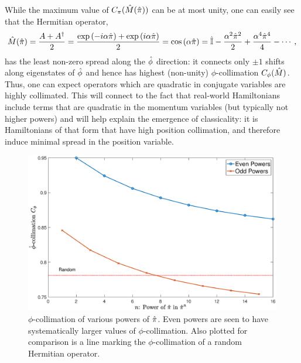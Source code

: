 \documentclass[aps,pra,onecolumn,nofootinbib,notitlepage,11pt,tightenlines]{revtex4-1}
\begin{document}
While the maximum value of $C_{\pi}(\hat{M}(\hat{\pi}))$ can be at most unity, one can easily see that the Hermitian operator,
\begin{equation}
\M(\oppi) = \frac{A + A^{\dag}}{2} = \frac{\exp{\left(- i \alpha \oppi\right)} + \exp{\left(i \alpha \oppi\right)}}{2} = \cos\left( \alpha \oppi \right) = \eye - \frac{\alpha^{2} \oppi^{2}}{2} + \frac{\alpha^{4} \oppi^{4}}{4} - \cdots \: ,
\end{equation}
has the least non-zero spread along the $\hat{\phi}$ direction: it connects only $\pm 1$ shifts along eigenstates of $\hat{\phi}$ and hence has highest (non-unity) $\phi$-collimation $C_{\phi}(\hat{M})$. 
Thus, one can expect operators which are quadratic in conjugate variables are highly collimated. This will connect to the fact that real-world Hamiltonians include terms that are quadratic in the momentum variables (but typically not higher powers) and will help explain the emergence of classicality: it is Hamiltonians of that form that have high position collimation, and therefore induce minimal spread in the position variable. 
\begin{figure}[h]
\includegraphics[width=\textwidth]{schwinger_powers.eps}
\caption{$\phi$-collimation of various powers of $\hat{\pi}$. Even powers are seen to have systematically larger values of $\phi$-collimation. Also plotted for comparison is a line marking the $\phi$-collimation of a random Hermitian operator.}
\label{schwinger_powers}
\end{figure}
\end{document}
